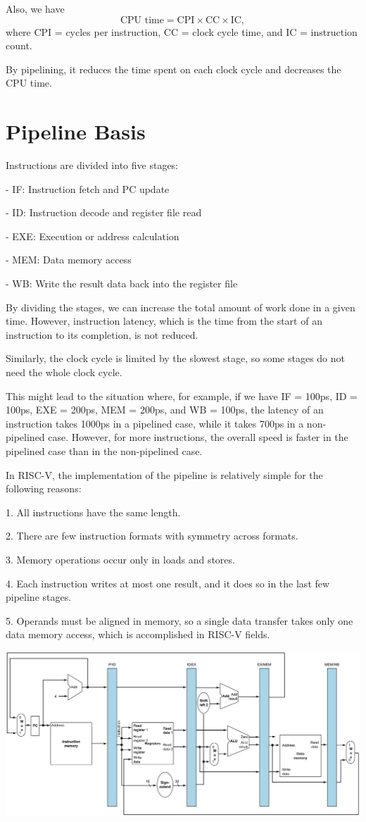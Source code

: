 Also, we have
\[
\text{CPU time} = \text{CPI} \times \text{CC} \times \text{IC},
\]
where CPI = cycles per instruction, CC = clock cycle time, and IC = instruction count.

By pipelining, it reduces the time spent on each clock cycle and decreases the CPU time.

\section{Pipeline Basis}
Instructions are divided into five stages:

- IF: Instruction fetch and PC update

- ID: Instruction decode and register file read

- EXE: Execution or address calculation

- MEM: Data memory access

- WB: Write the result data back into the register file

By dividing the stages, we can increase the total amount of work done in a given time. However, instruction latency, which is the time from the start of an instruction to its completion, is not reduced.

Similarly, the clock cycle is limited by the slowest stage, so some stages do not need the whole clock cycle.

This might lead to the situation where, for example, if we have IF = 100ps, ID = 100ps, EXE = 200ps, MEM = 200ps, and WB = 100ps, the latency of an instruction takes 1000ps in a pipelined case, while it takes 700ps in a non-pipelined case. However, for more instructions, the overall speed is faster in the pipelined case than in the non-pipelined case.

In RISC-V, the implementation of the pipeline is relatively simple for the following reasons:

1. All instructions have the same length.

2. There are few instruction formats with symmetry across formats.

3. Memory operations occur only in loads and stores.

4. Each instruction writes at most one result, and it does so in the last few pipeline stages.

5. Operands must be aligned in memory, so a single data transfer takes only one data memory access, which is accomplished in RISC-V fields.

\begin{center}
  \includegraphics[width=\textwidth]{Figure/Pipeline_reg.png}
\end{center}

